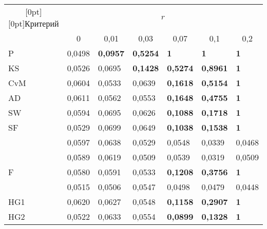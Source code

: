 \begin{table*}\small %
\begin{center}
\vspace*{2ex}

\begin{tabular}{|l|l|l|l|l|l|l|}
\hline
\multicolumn{1}{|c|}{\raisebox{-6pt}[0pt][0pt]{Критерий}}& \multicolumn{6}{c|}{$r$}\\
\cline{2-7}
&\multicolumn{1}{c|}{0}&\multicolumn{1}{c|}{0,01}&
\multicolumn{1}{c|}{0,03}&\multicolumn{1}{c|}{0,07}&\multicolumn{1}{c|}{0,1}&\multicolumn{1}{c|}{0,2}\\
\hline
\hspace*{4mm}P&0,0498&{\bf 0,0957}&{\bf 0,5254}&{\bf 1}&{\bf 1}&{\bf 1}\\
\hspace*{4mm}KS&0,0526&0,0695&{\bf 0,1428}&{\bf 0,5274}&{\bf 0,8961}&{\bf 1}\\
\hspace*{4mm}CvM&0,0604&0,0533&0,0639&{\bf 0,1618}&{\bf 0,5154}&{\bf 1}\\
\hspace*{4mm}AD&0,0611&0,0562&0,0553&{\bf 0,1648}&{\bf 0,4755}&{\bf 1}\\
\hspace*{4mm}SW&0,0594&0,0695&0,0626&{\bf 0,1088}&{\bf 0,1718}&{\bf 1}\\
\hspace*{4mm}SF&0,0529&0,0699&0,0649&{\bf 0,1038}&{\bf 0,1538}&{\bf 1}\\
\hspace*{4mm}{\bf JB}&0,0597&0,0638&0,0529&0,0548&0,0339&0,0468\\
\hspace*{4mm}{\bf AJB}&0,0589&0,0619&0,0509&0,0539&0,0319&0,0509\\
\hspace*{4mm}F&0,0580&0,0591&0,0533&{\bf 0,1208}&{\bf 0,3756}&{\bf 1}\\
\hspace*{4mm}{\bf G}&0,0515&0,0506&0,0547&0,0498&0,0479&0,0448\\
\hspace*{4mm}HG1&0,0620&0,0627&0,0548&{\bf 0,1158}&{\bf 0,2907}&{\bf 1}\\
\hspace*{4mm}HG2&0,0522&0,0633&0,0554&{\bf 0,0899}&{\bf 0,1328}&{\bf 1}\\

\end{tabular}
\end{center}
\end{table*}
